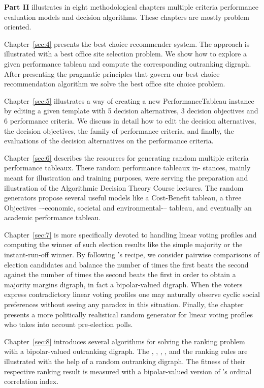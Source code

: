 \textbf{Part II} illustrates in eight methodological chapters multiple criteria performance evaluation models and decision algorithms. These chapters are mostly problem oriented.

Chapter~\ref{sec:4} presents the \Rubis best choice recommender system. The approach is illustrated with a best office site selection problem. We show how to explore a given performance tableau and compute the corresponding outranking digraph. After presenting the pragmatic principles that govern our best choice recommendation algorithm we solve the best office site choice problem.

Chapter~\ref{sec:5} illustrates a way of creating a new PerformanceTableau instance by editing a given template with 5 decision alternatives, 3 decision objectives and 6 performance criteria. We discuss in detail how to edit the decision alternatives, the decision objectives, the family of performance criteria, and finally, the evaluations of the decision alternatives on the performance criteria.

Chapter~\ref{sec:6} describes the \Digraph resources for generating random multiple criteria performance tableaux. These random performance tableaux in- stances, mainly meant for illustration and training purposes, were serving the preparation and illustration of the Algorithmic Decision Theory Course lectures. The random generators propose several useful models like a Cost-Benefit tableau, a three Objectives –-economic, societal and environmental-– tableau, and eventually an academic performance tableau.

Chapter~\ref{sec:7} is more specifically devoted to handling linear voting profiles and computing the winner of such election results like the simple majority or the instant-run-off winner. By following \Condorcet 's recipe, we consider pairwise comparisons of election candidates and balance the number of times the first beats the second against the number of times the second beats the first in order to obtain a majority margins digraph, in fact a bipolar-valued digraph. When the voters express contradictory linear voting profiles one may naturally observe cyclic social preferences without seeing any paradox in this situation. Finally, the chapter presents a more politically realistical random generator for linear voting profiles who takes into account pre-election polls.

Chapter~\ref{sec:8} introduces several algorithms for solving the ranking problem with a bipolar-valued outranking digraph. The \Copeland, \NetFlows, \Kemeny, \Slater, \Kohler and the \RankedPairs ranking rules are illustrated with the help of a random outranking digraph. The fitness of their respective ranking result is measured with a bipolar-valued version of \Kendall 's ordinal correlation index.

